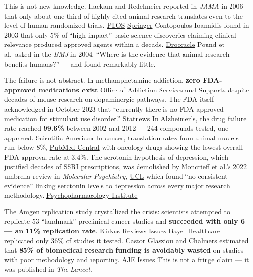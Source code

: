 This is not new knowledge. Hackam and Redelmeier reported in \emph{JAMA} in 2006 that only about one-third of highly cited animal research translates even to the level of human randomized trials. \href{https://journals.plos.org/plosmedicine/article?id=10.1371/journal.pmed.1000245}{PLOS} \href{https://link.springer.com/article/10.1186/s12967-019-1976-2}{Springer} Contopoulos-Ioannidis found in 2003 that only 5\% of ``high-impact'' basic science discoveries claiming clinical relevance produced approved agents within a decade. \href{https://www.droracle.ai/articles/236934/what-percentage-of-promising-animal-studies-fail-to-translate}{Drooracle} Pound et al.~asked in the \emph{BMJ} in 2004, ``Where is the evidence that animal research benefits humans?'' --- and found remarkably little.

The failure is not abstract. In methamphetamine addiction, \textbf{zero FDA-approved medications exist} \href{https://oasas.ny.gov/methamphetamine}{Office of Addiction Services and Supports} despite decades of mouse research on dopaminergic pathways. The FDA itself acknowledged in October 2023 that ``currently there is no FDA-approved medication for stimulant use disorder.'' \href{https://www.statnews.com/2023/10/04/methamphetamine-cocaine-addiction-treatment-fda/}{Statnews} In Alzheimer's, the drug failure rate reached \textbf{99.6\%} between 2002 and 2012 --- 244 compounds tested, one approved. \href{https://www.scientificamerican.com/article/why-alzheimer-s-drugs-keep-failing/}{Scientific American} In cancer, translation rates from animal models run below 8\%, \href{https://pmc.ncbi.nlm.nih.gov/articles/PMC3902221/}{PubMed Central} with oncology drugs showing the lowest overall FDA approval rate at 3.4\%. The serotonin hypothesis of depression, which justified decades of SSRI prescriptions, was demolished by Moncrieff et al.'s 2022 umbrella review in \emph{Molecular Psychiatry}, \href{https://www.ucl.ac.uk/news/2022/jul/no-evidence-depression-caused-low-serotonin-levels-finds-comprehensive-review}{UCL} which found ``no consistent evidence'' linking serotonin levels to depression across every major research methodology. \href{https://psychopharmacologyinstitute.com/section/the-serotonin-theory-of-depression-a-systematic-umbrella-review-of-the-evidence-2683-5270/}{Psychopharmacology Institute}

The Amgen replication study crystallized the crisis: scientists attempted to replicate 53 ``landmark'' preclinical cancer studies and \textbf{succeeded with only 6 --- an 11\% replication rate}. \href{https://www.kirkusreviews.com/book-reviews/richard-harris/rigor-mortis-sloppy-science/}{Kirkus Reviews} \href{https://issues.org/ending-reproducibility-crisis-medical-research-brownlee-bielekova/}{Issues} Bayer Healthcare replicated only 36\% of studies it tested. \href{https://www.castoredc.com/blog/replication-crisis-in-clinical-research/}{Castor} Glasziou and Chalmers estimated that \textbf{85\% of biomedical research funding is avoidably wasted} on studies with poor methodology and reporting. \href{https://www.aje.com/arc/pre-registration-vs-registered-reports}{AJE} \href{https://issues.org/ending-reproducibility-crisis-medical-research-brownlee-bielekova/}{Issues} This is not a fringe claim --- it was published in \emph{The Lancet}.

